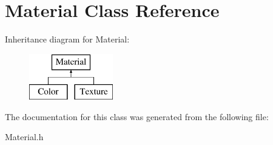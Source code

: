 \hypertarget{class_material}{\section{Material Class Reference}
\label{class_material}
}
Inheritance diagram for Material\-:\begin{figure}[H]
\begin{center}
\leavevmode
\includegraphics[height=2.000000cm]{class_material}
\end{center}
\end{figure}


The documentation for this class was generated from the following file\-:\begin{DoxyCompactItemize}
\item 
Material.\-h\end{DoxyCompactItemize}
